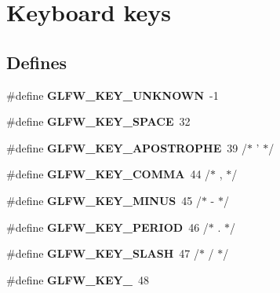 \hypertarget{group__keys}{\section{\-Keyboard keys}
\label{group__keys}
}
\subsection*{\-Defines}
\begin{DoxyCompactItemize}
\item 
\hypertarget{group__keys_ga99aacc875b6b27a072552631e13775c7}{\#define {\bfseries \-G\-L\-F\-W\-\_\-\-K\-E\-Y\-\_\-\-U\-N\-K\-N\-O\-W\-N}~-\/1}\label{group__keys_ga99aacc875b6b27a072552631e13775c7}

\item 
\hypertarget{group__keys_gaddb2c23772b97fd7e26e8ee66f1ad014}{\#define {\bfseries \-G\-L\-F\-W\-\_\-\-K\-E\-Y\-\_\-\-S\-P\-A\-C\-E}~32}\label{group__keys_gaddb2c23772b97fd7e26e8ee66f1ad014}

\item 
\hypertarget{group__keys_ga6059b0b048ba6980b6107fffbd3b4b24}{\#define {\bfseries \-G\-L\-F\-W\-\_\-\-K\-E\-Y\-\_\-\-A\-P\-O\-S\-T\-R\-O\-P\-H\-E}~39  /$\ast$ ' $\ast$/}\label{group__keys_ga6059b0b048ba6980b6107fffbd3b4b24}

\item 
\hypertarget{group__keys_gab3d5d72e59d3055f494627b0a524926c}{\#define {\bfseries \-G\-L\-F\-W\-\_\-\-K\-E\-Y\-\_\-\-C\-O\-M\-M\-A}~44  /$\ast$ , $\ast$/}\label{group__keys_gab3d5d72e59d3055f494627b0a524926c}

\item 
\hypertarget{group__keys_gac556b360f7f6fca4b70ba0aecf313fd4}{\#define {\bfseries \-G\-L\-F\-W\-\_\-\-K\-E\-Y\-\_\-\-M\-I\-N\-U\-S}~45  /$\ast$ -\/ $\ast$/}\label{group__keys_gac556b360f7f6fca4b70ba0aecf313fd4}

\item 
\hypertarget{group__keys_ga37e296b650eab419fc474ff69033d927}{\#define {\bfseries \-G\-L\-F\-W\-\_\-\-K\-E\-Y\-\_\-\-P\-E\-R\-I\-O\-D}~46  /$\ast$ . $\ast$/}\label{group__keys_ga37e296b650eab419fc474ff69033d927}

\item 
\hypertarget{group__keys_gadf3d753b2d479148d711de34b83fd0db}{\#define {\bfseries \-G\-L\-F\-W\-\_\-\-K\-E\-Y\-\_\-\-S\-L\-A\-S\-H}~47  /$\ast$ / $\ast$/}\label{group__keys_gadf3d753b2d479148d711de34b83fd0db}

\item 
\hypertarget{group__keys_ga50391730e9d7112ad4fd42d0bd1597c1}{\#define {\bfseries \-G\-L\-F\-W\-\_\-\-K\-E\-Y\-\_}~48}\label{group__keys_ga50391730e9d7112ad4fd42d0bd1597c1}


\end{DoxyCompactItemize}
